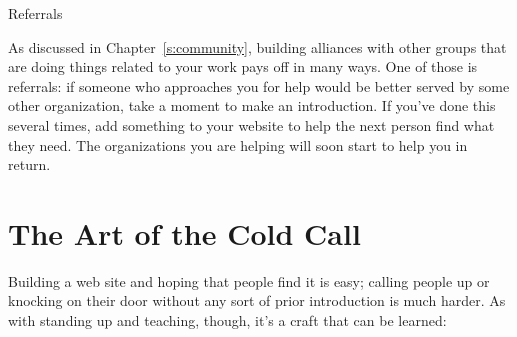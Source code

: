 \begin{aside}{Referrals}

  As discussed in Chapter~\ref{s:community},
  building alliances with other groups that are doing things related to your work
  pays off in many ways.
  One of those is referrals:
  if someone who approaches you for help would be better served by some other organization,
  take a moment to make an introduction.
  If you've done this several times,
  add something to your website to help the next person find what they need.
  The organizations you are helping will soon start to help you in return.

\end{aside}

\section{The Art of the Cold Call}\label{s:marketing-cold-call}

Building a web site and hoping that people find it is easy;
calling people up or knocking on their door without any sort of prior introduction
is much harder.
As with standing up and teaching,
though,
it's a craft that can be learned:

